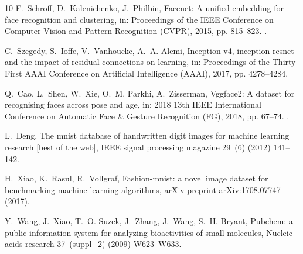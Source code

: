 \documentclass[final,3p,times]{elsarticle}
\theoremstyle{plain}
\begin{document}
\begin{thebibliography}{10}
F.~Schroff, D.~Kalenichenko, J.~Philbin, Facenet: A unified embedding for face recognition and clustering, in: Proceedings of the {IEEE} Conference on Computer Vision and Pattern Recognition ({CVPR}), 2015, pp. 815--823.
\newblock \href {https://doi.org/10.1109/CVPR.2015.7298682} {}.

C.~Szegedy, S.~Ioffe, V.~Vanhoucke, A.~A. Alemi, Inception-v4, inception-resnet and the impact of residual connections on learning, in: Proceedings of the Thirty-First {AAAI} Conference on Artificial Intelligence ({AAAI}), 2017, pp. 4278--4284.

Q.~Cao, L.~Shen, W.~Xie, O.~M. Parkhi, A.~Zisserman, Vggface2: A dataset for recognising faces across pose and age, in: 2018 13th {IEEE} International Conference on Automatic Face \& Gesture Recognition ({FG}), 2018, pp. 67--74.
\newblock \href {https://doi.org/10.1109/FG.2018.00020} {}.

L.~Deng, The mnist database of handwritten digit images for machine learning research [best of the web], IEEE signal processing magazine 29~(6) (2012) 141--142.

H.~Xiao, K.~Rasul, R.~Vollgraf, Fashion-mnist: a novel image dataset for benchmarking machine learning algorithms, arXiv preprint arXiv:1708.07747 (2017).

Y.~Wang, J.~Xiao, T.~O. Suzek, J.~Zhang, J.~Wang, S.~H. Bryant, Pubchem: a public information system for analyzing bioactivities of small molecules, Nucleic acids research 37~(suppl\_2) (2009) W623--W633.

\end{thebibliography}


\appendix
\end{document}

